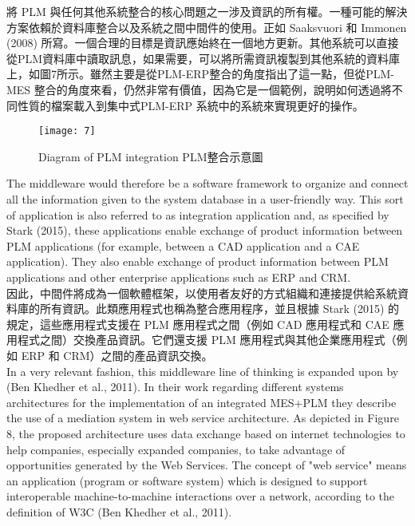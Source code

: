 \fontsize{14pt}{5pt}\sectionef
 {將 PLM 與任何其他系統整合的核心問題之一涉及資訊的所有權。一種可能的解決方案依賴於資料庫整合以及系統之間中間件的使用。正如 Saaksvuori 和 Immonen (2008) 所寫。一個合理的目標是資訊應始終在一個地方更新。其他系統可以直接從PLM資料庫中讀取訊息，如果需要，可以將所需資訊複製到其他系統的資料庫上，如圖7所示。雖然主要是從PLM-ERP整合的角度指出了這一點，但從PLM-MES 整合的角度來看，仍然非常有價值，因為它是一個範例，說明如何透過將不同性質的檔案載入到集中式PLM-ERP 系統中的系統來實現更好的操作。
}\\[15pt]
\begin{figure}[hbt!]
\begin{center}
\texttt{[image: 7]}
\caption{\Large Diagram of PLM integration PLM整合示意圖}\label{fig.7}
\end{center}
\end{figure}

\fontsize{14pt}{2.5pt}\sectionef 
{The middleware would therefore be a software framework to organize and connect all the information given to the system database in a user-friendly way. This sort of application is also referred to as integration application and, as specified by Stark (2015), these applications enable exchange of product information between PLM applications (for example, between a CAD application and a CAE application). They also enable exchange of product information between PLM applications and other enterprise applications such as ERP and CRM.}\\[10pt]

\fontsize{14pt}{5pt}\sectionef
 {因此，中間件將成為一個軟體框架，以使用者友好的方式組織和連接提供給系統資料庫的所有資訊。此類應用程式也稱為整合應用程序，並且根據 Stark (2015) 的規定，這些應用程式支援在 PLM 應用程式之間（例如 CAD 應用程式和 CAE 應用程式之間）交換產品資訊。它們還支援 PLM 應用程式與其他企業應用程式（例如 ERP 和 CRM）之間的產品資訊交換。}\\[15pt]

\fontsize{14pt}{2.5pt}\sectionef 
{In a very relevant fashion, this middleware line of thinking is expanded upon by (Ben Khedher et al., 2011). In their work regarding different systems architectures for the implementation of an integrated MES+PLM they describe the use of a mediation system in web service architecture. As depicted in Figure 8, the proposed architecture uses data exchange based on internet technologies to help companies, especially expanded companies, to take advantage of opportunities generated by the Web Services. The concept of "web service" means an application (program or software system) which is designed to support interoperable machine-to-machine interactions over a network, according to the definition of W3C (Ben Khedher et al., 2011).}\\[10pt]

